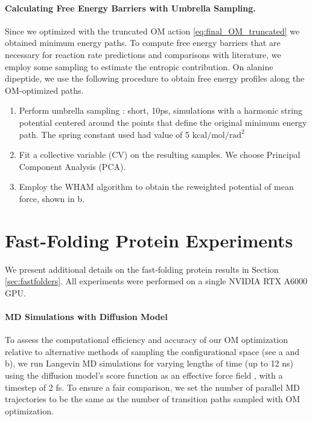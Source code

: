 \paragraph{Calculating Free Energy Barriers with Umbrella Sampling.}
Since we optimized with the truncated OM action \eqref{eq:final_OM_truncated} we obtained minimum energy paths. To compute free energy barriers that are necessary for reaction rate predictions and comparisons with literature, we employ some sampling to estimate the entropic contribution. On alanine dipeptide, we use the following procedure to obtain free energy profiles along the OM-optimized paths.
\begin{enumerate}
\item Perform umbrella sampling \cite{torrie1977nonphysical}: short, 10ps, simulations with a harmonic string potential centered around the points that define the original minimum energy path. The spring constant used had value of 5 $\text{kcal}/\text{mol}/\text{rad}^2$
\item Fit a collective variable (CV) on the resulting samples. We choose Principal Component Analysis (PCA).
\item Employ the WHAM algorithm \cite{kumar1992weighted} to obtain the reweighted potential of mean force, shown in b.
\end{enumerate}

\section{Fast-Folding Protein Experiments}
\label{sec:fastfolding_details}

We present additional details on the fast-folding protein results in Section \ref{sec:fastfolders}. All experiments were performed on a single NVIDIA RTX A6000 GPU. 

\paragraph{MD Simulations with Diffusion Model}
To assess the computational efficiency and accuracy of our OM optimization relative to alternative methods of sampling the configurational space (see a and b), we run Langevin MD simulations for varying lengths of time (up to 12 ns) using the diffusion model's score function as an effective force field \cite{arts2023two}, with a timestep of 2 fs. To ensure a fair comparison, we set the number of parallel MD trajectories to be the same as the number of transition paths sampled with OM optimization. 


